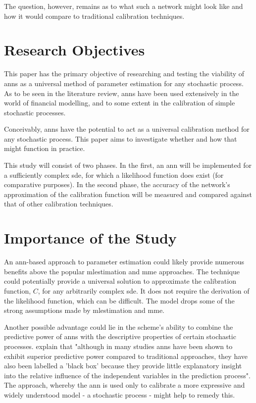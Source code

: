 \documentclass[11pt,oneside,openany,a4paper,english, report, goldenblock
]{usthesis}
\begin{document}
The question, however, remains as to what such a network might look like and how it would compare to traditional calibration techniques.

\section{Research Objectives}
This paper has the primary objective of researching and testing the viability of \acrshort{ann}s as a universal method of parameter estimation for any stochastic process. As to be seen in the literature review, \acrshort{ann}s have been used extensively in the world of financial modelling, and to some extent in the calibration of simple stochastic processes.


Conceivably, \acrshort{ann}s have the potential to act as a universal calibration method for any stochastic process. This paper aims to investigate whether and how that might function in practice.


This study will consist of two phases. In the first, an \acrshort{ann} will be implemented for a sufficiently complex \acrshort{sde}, for which a likelihood function does exist (for comparative purposes). In the second phase, the accuracy of the network's approximation of the calibration function will be measured and compared against that of other calibration techniques.

\section{Importance of the Study}

An \acrshort{ann}-based approach to parameter estimation could likely provide numerous benefits above the popular \acrshort{mlestimation} and \acrshort{mme} approaches.
The technique could potentially provide a universal solution to approximate the calibration function, $C$, for any arbitrarily complex \acrshort{sde}.
It does not require the derivation of the likelihood function, which can be difficult.
The model drops some of the strong assumptions made by \acrshort{mlestimation} and \acrshort{mme}. 


Another possible advantage could lie in the scheme's ability to combine the predictive power of \acrshort{ann}s with the descriptive properties of certain stochastic processes. \citet{Olden} explain that "although in many studies \acrshort{ann}s have been shown to exhibit superior predictive power compared to traditional approaches, they have also been labelled a 'black box' because they provide little explanatory insight into the relative influence of the independent variables in the prediction process". The approach, whereby the \acrshort{ann} is used only to calibrate a more expressive and widely understood model - a stochastic process - might help to remedy this.
\end{document}
